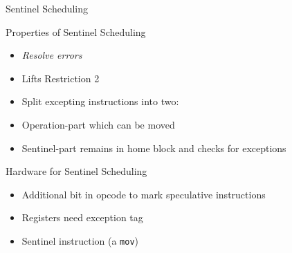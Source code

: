 \documentclass[presentation]{beamer}
\begin{document}
\begin{frame}{Sentinel Scheduling}
    
    \begin{block}{Properties of Sentinel Scheduling~\cite{10.1145/161541.159765}}
        \begin{itemize}
            \item \textit{Resolve errors}
            \item Lifts Restriction 2
            \item Split excepting instructions into two:
            \item Operation-part which can be moved
            \item Sentinel-part remains in home block and checks for exceptions
        \end{itemize}
    \end{block}
    \begin{block}{Hardware for Sentinel Scheduling}
        \begin{itemize}
            \item Additional bit in opcode to mark speculative instructions
            \item Registers need exception tag 
            \item Sentinel instruction (a \texttt{mov})
        \end{itemize}
    \end{block}
\end{frame}
\end{document}
